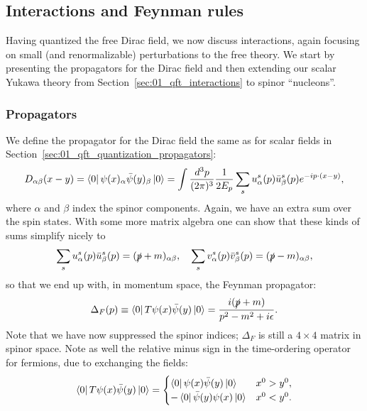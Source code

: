 \subsection{Interactions and Feynman rules}
\label{sec:01_qft_spinors_feynman}

Having quantized the free Dirac field, we now discuss interactions, again focusing on small (and renormalizable) perturbations to the free theory.
We start by presenting the propagators for the Dirac field and then extending our scalar Yukawa theory from Section~\ref{sec:01_qft_interactions} to spinor ``nucleons''.

\subsubsection{Propagators}

We define the propagator for the Dirac field the same as for scalar fields in Section~\ref{sec:01_qft_quantization_propagators}:
\begin{equation}
	\label{eq:01_qft_spinors_propagator}
	D_{\alpha\beta}(x - y) = \bra{0}\psi(x)_\alpha\bar\psi(y)_\beta\ket{0} = \int \frac{d^3p}{(2\pi)^3} \frac{1}{2E_p} \sum_s u^s_\alpha(p) \bar u^s_\beta(p) e^{-ip\cdot(x - y)},
\end{equation}
where $\alpha$ and $\beta$ index the spinor components.
Again, we have an extra sum over the spin states.
With some more matrix algebra one can show that these kinds of sums simplify nicely to
\begin{equation}
	\label{eq:01_qft_spinors_uvsum}
	\sum_s u^s_\alpha(p) \bar u^s_\beta(p) = (\cslashed{p} + m)_{\alpha\beta}, \quad \sum_s v^s_\alpha(p) \bar v^s_\beta(p) = (\cslashed{p} - m)_{\alpha\beta},
\end{equation}
so that we end up with, in momentum space, the Feynman propagator:
\begin{equation}
	\label{eq:01_qft_spinors_propagator_momentum}
	\Delta_F(p) \equiv \bra{0}T\psi(x)\bar\psi(y)\ket{0} =  \frac{i(\cslashed{p} + m)}{p^2 - m^2 + i\epsilon}.
\end{equation}
Note that we have now suppressed the spinor indices; $\Delta_F$ is still a $4\times4$ matrix in spinor space.
Note as well the relative minus sign in the time-ordering operator for fermions, due to exchanging the fields:
\begin{equation}
	\label{eq:01_qft_spinors_propagator_time_ordering}
	\bra{0}T\psi(x)\bar\psi(y)\ket{0} = \begin{cases} \bra{0}\psi(x)\bar\psi(y)\ket{0} & x^0 > y^0, \\ -\bra{0}\bar\psi(y)\psi(x)\ket{0} & x^0 < y^0. \end{cases}
\end{equation}

